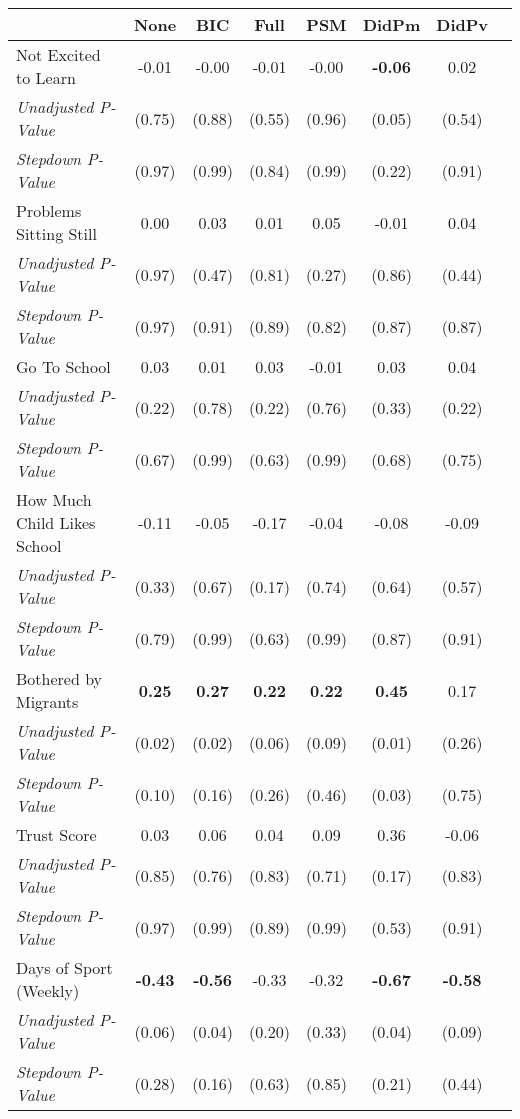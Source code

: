 \begin{tabular}{l c c c c c c c}
\toprule
 & None & BIC & Full & PSM & DidPm & DidPv \\
\midrule
Not Excited to Learn & -0.01 & -0.00 & -0.01 & -0.00 & \textbf{ -0.06 } & 0.02 \\
\quad \textit{Unadjusted P-Value} & (0.75) & (0.88) & (0.55) & (0.96) & (0.05) & (0.54) \\
\quad \textit{Stepdown P-Value} & (0.97) & (0.99) & (0.84) & (0.99) & (0.22) & (0.91) \\
Problems Sitting Still & 0.00 & 0.03 & 0.01 & 0.05 & -0.01 & 0.04 \\
\quad \textit{Unadjusted P-Value} & (0.97) & (0.47) & (0.81) & (0.27) & (0.86) & (0.44) \\
\quad \textit{Stepdown P-Value} & (0.97) & (0.91) & (0.89) & (0.82) & (0.87) & (0.87) \\
Go To School & 0.03 & 0.01 & 0.03 & -0.01 & 0.03 & 0.04 \\
\quad \textit{Unadjusted P-Value} & (0.22) & (0.78) & (0.22) & (0.76) & (0.33) & (0.22) \\
\quad \textit{Stepdown P-Value} & (0.67) & (0.99) & (0.63) & (0.99) & (0.68) & (0.75) \\
How Much Child Likes School & -0.11 & -0.05 & -0.17 & -0.04 & -0.08 & -0.09 \\
\quad \textit{Unadjusted P-Value} & (0.33) & (0.67) & (0.17) & (0.74) & (0.64) & (0.57) \\
\quad \textit{Stepdown P-Value} & (0.79) & (0.99) & (0.63) & (0.99) & (0.87) & (0.91) \\
Bothered by Migrants & \textbf{ 0.25 } & \textbf{ 0.27 } & \textbf{ 0.22 } & \textbf{ 0.22 } & \textbf{ 0.45 } & 0.17 \\
\quad \textit{Unadjusted P-Value} & (0.02) & (0.02) & (0.06) & (0.09) & (0.01) & (0.26) \\
\quad \textit{Stepdown P-Value} & (0.10) & (0.16) & (0.26) & (0.46) & (0.03) & (0.75) \\
Trust Score & 0.03 & 0.06 & 0.04 & 0.09 & 0.36 & -0.06 \\
\quad \textit{Unadjusted P-Value} & (0.85) & (0.76) & (0.83) & (0.71) & (0.17) & (0.83) \\
\quad \textit{Stepdown P-Value} & (0.97) & (0.99) & (0.89) & (0.99) & (0.53) & (0.91) \\
Days of Sport (Weekly) & \textbf{ -0.43 } & \textbf{ -0.56 } & -0.33 & -0.32 & \textbf{ -0.67 } & \textbf{ -0.58 } \\
\quad \textit{Unadjusted P-Value} & (0.06) & (0.04) & (0.20) & (0.33) & (0.04) & (0.09) \\
\quad \textit{Stepdown P-Value} & (0.28) & (0.16) & (0.63) & (0.85) & (0.21) & (0.44) \\
\bottomrule
\end{tabular}
